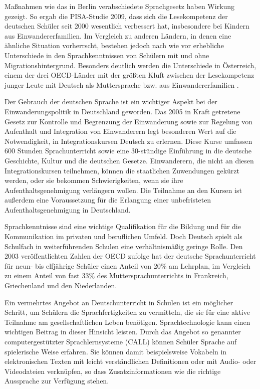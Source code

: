 \documentclass[]{../../metanetpaper}
\begin{document}
\begin{Parallel}[c]{80mm}{80mm}
{Maßnahmen wie das in Berlin verabschiedete Sprachgesetz haben Wirkung gezeigt. So ergab die PISA-Studie 2009, dass sich die Lesekompetenz der deutschen Schüler seit 2000 wesentlich verbessert hat, insbesondere bei Kindern aus Einwandererfamilien. Im Vergleich zu anderen Ländern, in denen eine ähnliche Situation vorherrscht, bestehen jedoch nach wie vor erhebliche Unterschiede in den Sprachkenntnissen von Schülern mit und ohne Migrationshintergrund. Besonders deutlich werden die Unterschiede in Österreich, einem der drei OECD-Länder mit der größten Kluft zwischen der Lesekompetenz junger Leute mit Deutsch als Muttersprache bzw. aus Einwandererfamilien .

Der Gebrauch der deutschen Sprache ist ein wichtiger Aspekt bei der Einwanderungspolitik in Deutschland geworden. Das 2005 in Kraft getretene Gesetz zur Kontrolle und Begrenzung der Einwanderung sowie zur Regelung von Aufenthalt und Integration von Einwanderern legt besonderen Wert auf die Notwendigkeit, in Integrationskursen Deutsch zu erlernen. Diese Kurse umfassen 600 Stunden Sprachunterricht sowie eine 30-stündige Einführung in die deutsche Geschichte, Kultur und die deutschen Gesetze. Einwanderern, die nicht an diesen Integrationskursen teilnehmen, können die staatlichen Zuwendungen gekürzt werden, oder sie bekommen Schwierigkeiten, wenn sie ihre Aufenthaltsgenehmigung verlängern wollen. Die Teilnahme an den Kursen ist außerdem eine Voraussetzung für die Erlangung einer unbefristeten Aufenthaltsgenehmigung in Deutschland.

Sprachkenntnisse sind eine wichtige Qualifikation für die Bildung und für die Kommunikation im privaten und beruflichen Umfeld. Doch Deutsch spielt als Schulfach in weiterführenden Schulen eine verhältnismäßig geringe Rolle. Den 2003 veröffentlichten Zahlen der OECD zufolge hat der deutsche Sprachunterricht für neun- bis elfjährige Schüler einen Anteil von 20\% am Lehrplan, im Vergleich zu einem Anteil von fast 33\% des Muttersprachunterrichts in Frankreich, Griechenland und den Niederlanden.

Ein vermehrtes Angebot an Deutschunterricht in Schulen ist ein möglicher Schritt, um Schülern die Sprachfertigkeiten zu vermitteln, die sie für eine aktive Teilnahme am gesellschaftlichen Leben benötigen. Sprachtechnologie kann einen wichtigen Beitrag in dieser Hinsicht leisten. Durch das Angebot so genannter computergestützter Sprachlernsysteme (CALL) können Schüler Sprache auf spielerische Weise erfahren. Sie können damit beispielsweise Vokabeln in elektronischen Texten mit leicht verständlichen Definitionen oder mit Audio- oder Videodateien verknüpfen, so dass Zusatzinformationen wie die richtige Aussprache zur Verfügung stehen.
  }


\end{Parallel}
\end{document}
